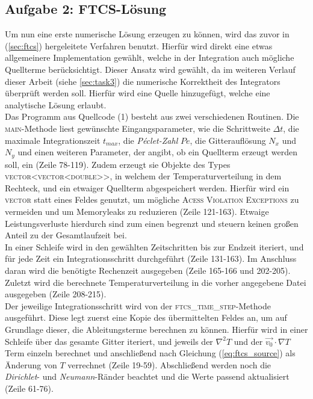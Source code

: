 \documentclass[12pt,a4paper,titlepage,headinclude,bibtotoc]{scrartcl}
\begin{document}
\subsection{Aufgabe 2: FTCS-Lösung}
\label{sec:task2}
Um nun eine erste numerische Lösung erzeugen zu können, wird das zuvor in (\ref{sec:ftcs}) hergeleitete Verfahren benutzt. Hierfür wird direkt eine etwas allgemeinere Implementation gewählt, welche in der Integration auch mögliche Quellterme berücksichtigt. Dieser Ansatz wird gewählt, da im weiteren Verlauf dieser Arbeit (siehe \ref{sec:task3}) die numerische Korrektheit des Integrators überprüft werden soll. Hierfür wird eine Quelle hinzugefügt, welche eine analytische Lösung erlaubt.\\
Das Programm aus Quellcode (1) besteht aus zwei verschiedenen Routinen. Die \textsc{main}-Methode liest gewünschte Eingangsparameter, wie die Schrittweite $\Delta t$, die maximale Integrationszeit $t_{max}$, die \textit{Péclet-Zahl} $Pe$, die Gitterauflösung $N_x$ und $N_y$ und einen weiteren Parameter, der angibt, ob ein Quellterm erzeugt werden soll, ein (Zeile 78-119). Zudem erzeugt sie Objekte des Types \textsc{vector\textless vector\textless double\textgreater \textgreater}, in welchem der Temperaturverteilung in dem Rechteck, und ein etwaiger Quellterm abgespeichert werden. Hierfür wird ein \textsc{vector} statt eines Feldes genutzt, um mögliche \textsc{Acess Violation Exceptions} zu vermeiden und um Memoryleaks zu reduzieren (Zeile 121-163). Etwaige Leistungsverluste hierdurch sind zum einen begrenzt und steuern keinen großen Anteil zu der Gesamtlaufzeit bei.\\
In einer Schleife wird in den gewählten Zeitschritten bis zur Endzeit iteriert, und für jede Zeit ein Integrationsschritt durchgeführt (Zeile 131-163). Im Anschluss daran wird die benötigte Rechenzeit ausgegeben (Zeile 165-166 und 202-205). Zuletzt wird die berechnete Temperaturverteilung in die vorher angegebene Datei ausgegeben (Zeile 208-215).\\
Der jeweilige Integrationsschritt wird von der \textsc{ftcs\_time\_step}-Methode ausgeführt. Diese legt zuerst eine Kopie des übermittelten Feldes an, um auf Grundlage dieser, die Ableitungsterme berechnen zu können. Hierfür wird in einer Schleife über das gesamte Gitter iteriert, und jeweils der $\nabla^2 T$ und der $\vec{v_0} \cdot \nabla T$ Term einzeln berechnet und anschließend nach Gleichung (\ref{eq:ftcs_source}) als Änderung von $T$ verrechnet (Zeile 19-59). Abschließend werden noch die \textit{Dirichlet}- und \textit{Neumann}-Ränder beachtet und die Werte passend aktualisiert (Zeile 61-76). 
\end{document}
